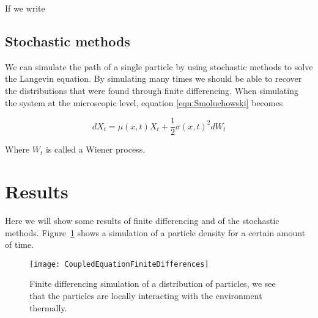 \documentclass[
10pt, %
a4paper, %
oneside, %
headinclude,footinclude, %
BCOR5mm, %
]{scrartcl}
\begin{document}
If we write 
\subsection{Stochastic methods}
We can simulate the path of a single particle by using stochastic methods to solve the Langevin equation. By simulating many times we should be able to recover the distributions that were found through finite differencing. When simulating the system  at the microscopic level, equation \ref{eqn:Smoluchowski} becomes

\begin{equation}
d X_t = \mu(x, t) X_t + \frac{1}{2} \sigma(x, t)^2  d W_t
\end{equation}

Where $W_t$ is called a Wiener process.

\section{Results}
Here we will show some results of finite differencing and of the stochastic methods. Figure~\ref{fig:FiniteDifferences} shows a simulation of a particle density for a certain amount of time.

\begin{figure}[tb]
\centering 
\texttt{[image: CoupledEquationFiniteDifferences]} 
\caption{Finite differencing simulation of a distribution of particles, we see that the particles are locally interacting with the environment thermally.}
\label{fig:FiniteDifferences} 
\end{figure}





\cite{BlickleBechinger2011}







\end{document}
